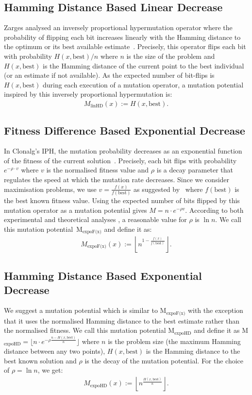 \documentclass[lettersize,journal]{IEEEtran}
\newcommand{\expoF}{M$_{\text{expoF(x)}}$}
\newcommand{\expoHD}{M$_{\text{expoHD}}$}
\begin{document}
 	 
 \subsection*{Hamming Distance Based Linear Decrease}
 Zarges analysed an inversely proportional hypermutation operator where the probability of flipping each bit increases linearly with the Hamming distance to the optimum or its best available estimate~\cite{Zarges2008}.
Precisely, this operator flips each bit with probability $H(x,\text{best})/n$ where $n$ is the size of the problem and $H(x,\text{best})$ is the Hamming distance of the current point to the best individual (or an estimate if not available). As the expected number of bit-flips is $H(x, \text{best})$ during each execution of a mutation operator, a mutation potential inspired by this inversely proportional hypermutation is:
\begin{align*}M_{\text{linHD}}(x):=H(x,\text{best}).
 \end{align*}
 
\subsection*{Fitness Difference Based Exponential Decrease}
In Clonalg's  IPH,  
 	the mutation probability decreases as an exponential function of the fitness of the current solution~\cite{DecastroVonzuben2002}. Precisely, each bit flips with probability $e^{-\rho \cdot v}$ where $v$ is the normalised fitness value and $\rho$ is a decay parameter that regulates the speed at which the mutation rate  decreases.
 Since we consider maximisation problems, we use $v=\frac{f(x)}{f(\text{best})}$ as suggested by~\cite{Zarges2008} where $f(\text{best})$ is the best known fitness value. Using the expected number of bits flipped by this mutation operator as a mutation potential gives $M=n \cdot e^{-\rho  v}$. According to both experimental and theoretical analyses 
 \cite{Zarges2008}, a reasonable value for $\rho$ is $\ln n$. We call this mutation potential~{\expoF } and define it as:
 \begin{align*} M_{\text{expoF(x)}}(x):=\left\lfloor n^{1-\frac{f(x)}{f(\text{best})}} \right\rfloor.
 \end{align*}
 
 
 \subsection*{Hamming Distance Based Exponential Decrease}
 We suggest a mutation potential which is similar to {\expoF } with the exception that it uses the normalised Hamming distance to the best estimate rather than the normalised fitness. We call this mutation potential {\expoHD } and define it as \expoHD$=\lfloor n \cdot e^{-\rho \frac{n-H(x,\text{best})}{n}}\rfloor$ where $n$ is the problem size (the maximum Hamming distance between  any two  points), $H(x,\text{best})$ is the Hamming distance to the best known solution and $\rho$ is the decay of the mutation potential. For the choice of $\rho=\ln n$, we get: \begin{align*}M_{\text{expoHD}}(x):=\left\lfloor n^{\frac{H(x,\text{best})}{n}} \right\rfloor.
 	\end{align*}
 	
\end{document}
